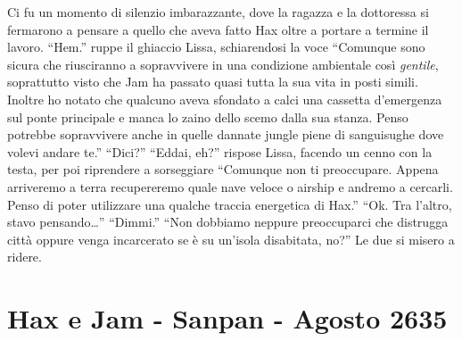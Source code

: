     Ci fu un momento di silenzio imbarazzante, dove la ragazza e la
    dottoressa si fermarono a pensare a quello che aveva fatto Hax oltre a
    portare a termine il lavoro. ``Hem.'' ruppe il ghiaccio Lissa,
    schiarendosi la voce ``Comunque
    sono sicura che riusciranno a sopravvivere in una condizione ambientale
    così \emph{gentile}, soprattutto visto che Jam ha passato quasi tutta
    la sua vita in posti simili. Inoltre ho notato che qualcuno aveva
    sfondato a calci una cassetta d'emergenza sul ponte principale e manca
    lo zaino dello scemo dalla sua stanza. Penso potrebbe sopravvivere anche
    in quelle dannate jungle piene di sanguisughe dove volevi andare te.''
    ``Dici?'' ``Eddai, eh?'' rispose Lissa, facendo un cenno con la testa,
    per poi riprendere a sorseggiare ``Comunque non ti preoccupare. Appena
    arriveremo a terra recupereremo quale nave veloce o airship e andremo a
    cercarli. Penso di poter utilizzare una qualche traccia energetica di
    Hax.'' ``Ok. Tra l'altro, stavo pensando\dots{}'' ``Dimmi.'' ``Non
    dobbiamo neppure preoccuparci che distrugga città oppure venga
    incarcerato se è su un'isola disabitata, no?'' Le due si misero a
    ridere.

  \section{Hax e Jam - Sanpan - Agosto 2635}

